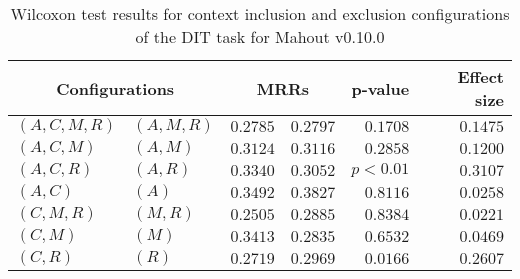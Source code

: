 
\begin{table}
\begin{spacing}{1.2}
\centering
\caption{Wilcoxon test results for context inclusion and exclusion configurations of the DIT task for Mahout v0.10.0}
\label{table:versus-wilcox-mahout-dit-context}
\begin{tabular}{ll|rr|rr}
\toprule
      \multicolumn{2}{c|}{Configurations} &          \multicolumn{2}{c|}{MRRs} &       p-value & Effect size \\
\midrule
 $(A,C,M,R)$ &  $(A,M,R)$ & $0.2785$ & $0.2797$ & $0.1708$ &    $0.1475$ \\
   $(A,C,M)$ &    $(A,M)$ & $0.3124$ & $0.3116$ & $0.2858$ &    $0.1200$ \\
   $(A,C,R)$ &    $(A,R)$ & $0.3340$ & $0.3052$ & $p<0.01$ &    $0.3107$ \\
     $(A,C)$ &      $(A)$ & $0.3492$ & $0.3827$ & $0.8116$ &    $0.0258$ \\
   $(C,M,R)$ &    $(M,R)$ & $0.2505$ & $0.2885$ & $0.8384$ &    $0.0221$ \\
     $(C,M)$ &      $(M)$ & $0.3413$ & $0.2835$ & $0.6532$ &    $0.0469$ \\
     $(C,R)$ &      $(R)$ & $0.2719$ & $0.2969$ & $0.0166$ &    $0.2607$ \\
\bottomrule
\end{tabular}

\end{spacing}
\end{table}

